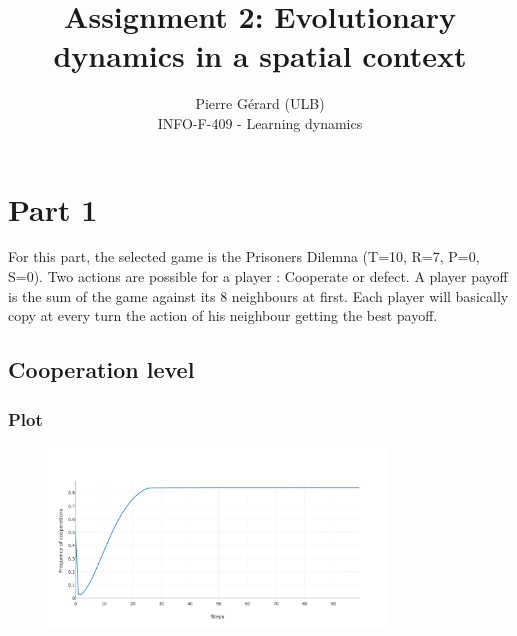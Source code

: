 \documentclass[11pt]{article}
\begin{document}
 
 
\setlength\parindent{0pt}
 
\title{Assignment 2: Evolutionary dynamics in a spatial context}%
\author{Pierre Gérard (ULB)\\ %
INFO-F-409 - Learning dynamics} %
 
\maketitle

\section{Part 1}
For this part, the selected game is the Prisoners Dilemna (T=10, R=7, P=0, S=0). Two actions are possible for a player : Cooperate or defect. A player payoff is the sum of the game against its 8 neighbours at first. Each player will basically copy at every turn the action of his neighbour getting the best payoff.

\subsection{Cooperation level}

\subsubsection{Plot}

\begin{figure}[H]
   \centering
   \includegraphics[width=0.8\textwidth]{img/part1/cf-moore-notmyself.png}
\end{figure}
\end{document}
